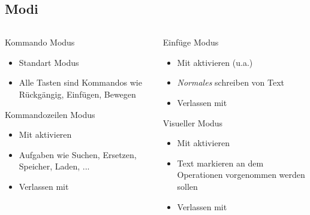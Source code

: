 \documentclass[aspectratio=43]{beamer}
\begin{document}
\subsection{Modi}
\begin{frame} 
\begin{columns}
        \begin{column}{0.5\textwidth}
          
          \begin{block}{Kommando ­Modus} 
            \begin{itemize}
            \item Standart Modus
            \item Alle Tasten sind Kommandos wie Rückgängig, Einfügen, Bewegen
            \end{itemize}
          \end{block}
          
          \begin{block}{Kommandozeilen­ Modus} 
            \begin{itemize}
            \item Mit \taste{:} aktivieren
            \item Aufgaben wie Suchen, Ersetzen, Speicher, Laden, ...
            \item Verlassen mit 
            \end{itemize}
          \end{block}
          
         \end{column} 
        \begin{column}{0.5\textwidth}

          \begin{block}{Einfüge­ Modus} 
            \begin{itemize}
            \item Mit  aktivieren (u.a.)
            \item \textit{Normales} schreiben von Text
            \item Verlassen mit 
            \end{itemize}
          \end{block}
          
          \begin{block}{Visueller Modus} 
            \begin{itemize}
            \item Mit  aktivieren
            \item Text markieren an dem Operationen vorgenommen werden sollen
            \item Verlassen mit 
            \end{itemize}
          \end{block}
        
        \end{column} 
\end{columns}
\end{frame}
\end{document}
